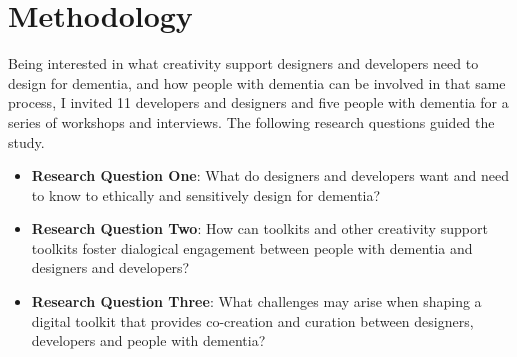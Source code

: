 

\renewcommand{\arraystretch}{1.4}


\section{Methodology}
\label{D3:Methodology}
Being interested in what creativity support designers and developers need to design for dementia, and how people with dementia can be involved in that same process, I invited 11 developers and designers and five people with dementia for a series of workshops and interviews. The following research questions guided the study. 
\begin{itemize}
    \item \textbf{Research Question One}: What do designers and developers want and need to know to ethically and sensitively design for dementia?
    \item \textbf{Research Question Two}: How can toolkits and other creativity support toolkits foster dialogical engagement between people with dementia and designers and developers?
    \item \textbf{Research Question Three}: What challenges may arise when shaping a digital toolkit that provides co-creation and curation between designers, developers and people with dementia?
\end{itemize}

